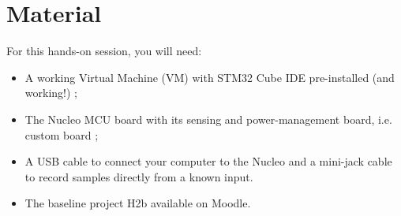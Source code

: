 \section*{Material}

\begin{comment}[couleur = gray!20, arrondi = 0.2, logo=\bcinfo]{}
\vspace{0.2cm}
\end{comment}
For this hands-on session, you will need:
\begin{itemize}
    \item A working Virtual Machine (VM) with STM32 Cube IDE pre-installed (and working!) ;
    \item The Nucleo MCU board with its sensing and power-management board, i.e. custom board ;
    \item A USB cable to connect your computer to the Nucleo and a mini-jack cable to record samples directly from a known input.
    \item The baseline project H2b available on Moodle.
\end{itemize}
